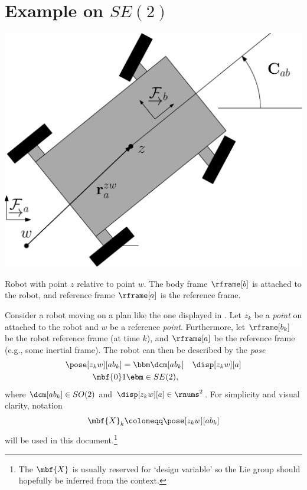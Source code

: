 \documentclass[ nobib, nofonts, notoc]{tufte-handout}
\begin{document}
    \section[Example on the planar Special Euclidean group]{Example on $SE(2)$}
    \begin{marginfigure}%
        \includegraphics[width=\linewidth]{figs/Graphics/car_body.eps}
        \caption{Robot with point $z$ relative to point $w$. The body frame $\rframe[b]$ is attached to the robot, and reference frame $\rframe[a]$ is the reference frame.}
        \label{fig:car body}
    \end{marginfigure}
    Consider a robot moving on a plan like the one displayed in . 
    Let $z_{k}$ be a \emph{point} on attached to the robot and $w$ be a reference \emph{point}. 
    Furthermore, let $\rframe[b_{k}]$ be the robot reference frame (at time $k$), and $\rframe[a]$ be the reference frame (e.g., some inertial frame).
    The robot can then be described by the \emph{pose}
    \begin{align}
        \pose[z_{k}w][ab_{k}] &= 
        \bbm
            \dcm[ab_{k}] & \disp[z_{k}w][a] \\
            \mbf{0} & 1
        \ebm \in SE(2),
    \end{align}
    where $\dcm[ab_{k}]\in SO(2)$ and $\disp[z_{k}w][a]\in\rnums^{2}$. 
    For simplicity and visual clarity, notation 
    \begin{align}
        \mbf{X}_{k} \coloneqq \pose[z_{k}w][ab_{k}]
    \end{align}
    will be used in this document.\footnote{The $\mbf{X}$ is usually reserved for `design variable' so the Lie group should hopefully be inferred from the context.}
\end{document}
